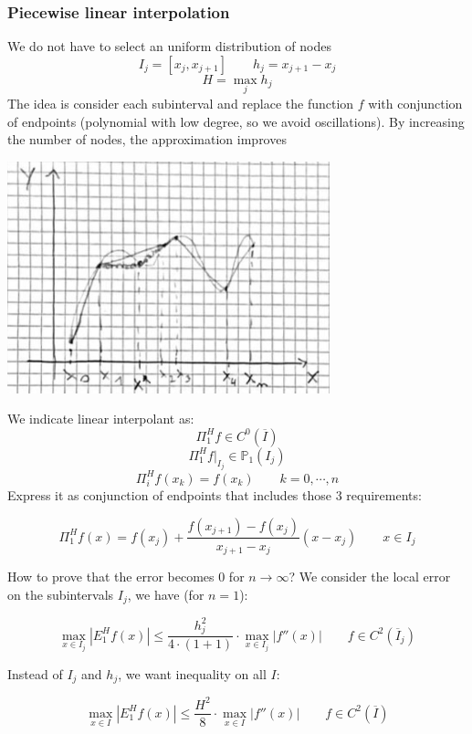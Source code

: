     \subsubsection{Piecewise linear interpolation}
    We do not have to select an uniform distribution of nodes
    $$
    I_j=\left[x_j,x_{j+1}\right]\qquad h_j=x_{j+1}-x_j
    $$
    $$
    H=\max_jh_j
    $$
    The idea is consider each subinterval and replace the function $f$ with conjunction of endpoints (polynomial with low degree, so we avoid oscillations). By increasing the number of nodes, the approximation improves
    \begin{center}
        \includegraphics[width=0.7\textwidth]{images/piecewise.png}
    \end{center}
    We indicate linear interpolant as:
    $$
    \Pi_1^Hf\in C^0(\overline{I})
    $$
    $$
    \Pi_1^Hf\Big|_{I_j}\in \mathbb{P}_1(I_j)
    $$
    $$
    \Pi_i^Hf(x_k)=f(x_k)\qquad k=0,\cdots,n
    $$
    Express it as conjunction of endpoints that includes those 3 requirements:
    \begin{LARGE}
        $$
        \Pi_1^Hf(x)=f(x_j)+\frac{
            f(x_{j+1})-f(x_j)
        }{
            x_{j+1}-x_j
        }(x-x_j)\qquad
        x\in I_j
        $$
    \end{LARGE}
    How to prove that the error becomes 0 for $n\rightarrow\infty$? We consider the local error on the subintervals $I_j$, we have (for $n=1$):
    \begin{LARGE}
        $$
        \max_{x\in I_j}\left|E_1^Hf(x)\right|
        \leq
        \frac{
            h_j^2
        }{
            4\cdot(1+1)
        }\cdot
        \max_{x\in I_j}\left|
            f''(x)
        \right|\qquad
        f\in C^2(\overline{I}_j)
        $$
    \end{LARGE}
    Instead of $I_j$ and $h_j$, we want inequality on all $I$:
    \begin{LARGE}
        $$
        \max_{x\in I}\left|E_1^Hf(x)\right|
        \leq
        \frac{
            H^2
        }{
            8
        }\cdot
        \max_{x\in I}\left|
            f''(x)
        \right|\qquad
        f\in C^2(\overline{I})
        $$
    \end{LARGE}
